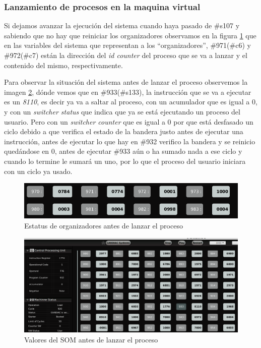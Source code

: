 \documentclass[letterpaper,12pt,oneside]{book}
\begin{document}
		\subsubsection{Lanzamiento de procesos en la maquina virtual}		
		
		Si dejamos avanzar la ejecución del sistema cuando haya pasado de \#s107 y sabiendo que no hay que reiniciar los organizadores observamos 
		en la figura \ref{fig:varSisStatExec1} que en
		las variables del sistema que representan a los ``organizadores'', \#971(\#c6) y \#972(\#c7) están la dirección del \textit{id counter} del proceso que se va
		a lanzar y el contenido del mismo, respectivamente.
		
		Para observar la situación del sistema antes de lanzar el proceso observemos la imagen \ref{fig:lanzaExec1Prev},
		dónde vemos que en \#933(\#s133), la instrucción que se va a ejecutar es un \textit{8110}, es decir ya va a saltar al proceso, con un acumulador que es igual a 0,
		y con un \textit{switcher status} que indica que ya se está ejecutando un proceso del usuario. Pero con un \textit{switcher counter} que es igual a 0 por
		que está desfasado un ciclo debido a que verifica el estado de la bandera justo antes de ejecutar una instrucción, antes de ejecutar lo que hay
		en \#932 verifico la bandera y se reinicio quedándose en 0, antes de ejecutar  \#933 aún o ha sumado nada a ese ciclo y cuando lo termine le 
		sumará un uno, por lo que el proceso del usuario iniciara con un ciclo ya usado.
	


		\begin{figure}[h]		
			\centering
			\includegraphics[scale=0.5]{media/CARDIACC/VariablesSistemaEstatusExec1.png}
			\caption{ Estatus de organizadores antes de lanzar el proceso}
			\label{fig:varSisStatExec1}
		\end{figure}		
		

		\begin{figure}[h]		
			\centering
			\includegraphics[scale=0.4]{media/CARDIACC/LanzamientoExec1Prev.png}
			\caption{ Valores del SOM antes de lanzar el proceso}
			\label{fig:lanzaExec1Prev}
		\end{figure}		
		
\end{document}
